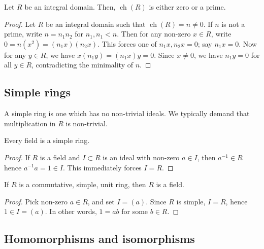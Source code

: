 \documentclass[11pt]{article}
\DeclareMathOperator{\ch}{ch}
\theoremstyle{definition}
\theoremstyle{remark}
\numberwithin{equation}{section}
\begin{document}
    \begin{theorem}
        Let $R$ be an integral domain. Then, $\ch(R)$ is either zero or a prime.
    \end{theorem}
    \begin{proof}
        Let $R$ be an integral domain such that $\ch(R) = n \neq 0$. If $n$ is not a
        prime, write $n = n_1n_2$ for $n_1, n_1 < n$. Then for any non-zero $x \in
        R$, write $0 = n(x^2) = (n_1x)(n_2x)$. This forces one of $n_1x, n_2x = 0$;
        say $n_1x = 0$. Now for any $y \in R$, we have $x(n_1 y) = (n_1 x)y = 0$.
        Since $x \neq 0$, we have $n_1y = 0$ for all $y \in R$, contradicting the
        minimality of $n$.
    \end{proof}


    \subsection{Simple rings}

    \begin{definition}
        A simple ring is one which has no non-trivial ideals. We typically demand
        that multiplication in $R$ is non-trivial.
    \end{definition}

    \begin{lemma}
        Every field is a simple ring.
    \end{lemma}
    \begin{proof}
        If $R$ is a field and $I\subset R$ is an ideal with non-zero $a \in I$, then
        $a^{-1} \in R$ hence $a^{-1}a = 1 \in I$. This immediately forces $I = R$.
    \end{proof}
    \begin{lemma}
        If $R$ is a commutative, simple, unit ring, then $R$ is a field.
    \end{lemma}
    \begin{proof}
        Pick non-zero $a \in R$, and set $I = (a)$. Since $R$ is simple, $I = R$,
        hence $1 \in I = (a)$. In other words, $1 = ab$ for some $b \in R$.
    \end{proof}


    \subsection{Homomorphisms and isomorphisms}
    
\end{document}
